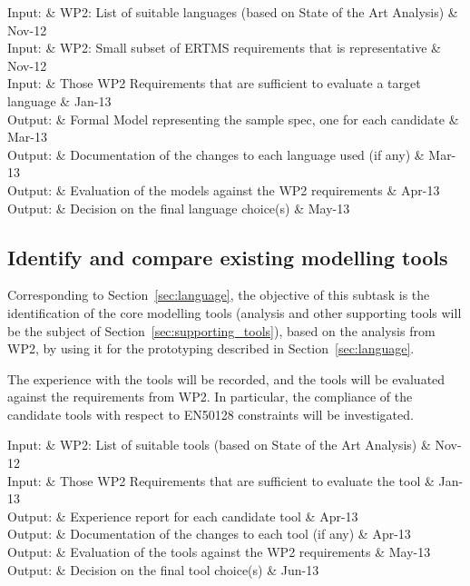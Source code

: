 \documentclass{template/openetcs_article}
\begin{document}

\begin{inoutput}
Input: & WP2: List of suitable languages (based on State of the Art Analysis) & Nov-12 \\
Input: & WP2: Small subset of ERTMS requirements that is representative & Nov-12 \\
Input: & Those WP2 Requirements that are sufficient to evaluate a target language & Jan-13 \\
\hline
Output: & Formal Model representing the sample spec, one for each candidate & Mar-13 \\
Output: & Documentation of the changes to each language used (if any) & Mar-13 \\
Output: & Evaluation of the models against the WP2 requirements & Apr-13 \\
Output: & Decision on the final language choice(s) & May-13 \\
\end{inoutput}



\subsection{Identify and compare existing modelling tools}
\label{sec:tool}

Corresponding to Section~\ref{sec:language}, the objective of this
subtask is the identification of the core modelling tools 
(analysis and other supporting tools will be the subject of 
Section~\ref{sec:supporting_tools}), 
based on the
analysis from WP2, by using it for the prototyping described in
Section~\ref{sec:language}. 

The experience with the tools will be recorded, and the tools will be
evaluated against the requirements from WP2. In particular, the compliance of
the candidate tools with respect to EN50128 constraints will be investigated.

\begin{inoutput}
Input: & WP2: List of suitable tools (based on State of the Art Analysis) & Nov-12 \\
Input: & Those WP2 Requirements that are sufficient to evaluate the tool & Jan-13 \\
\hline
Output: & Experience report for each candidate tool & Apr-13 \\
Output: & Documentation of the changes to each tool (if any) & Apr-13 \\
Output: & Evaluation of the tools against the WP2 requirements & May-13 \\
Output: & Decision on the final tool choice(s) & Jun-13 \\
\end{inoutput}
\end{document}
